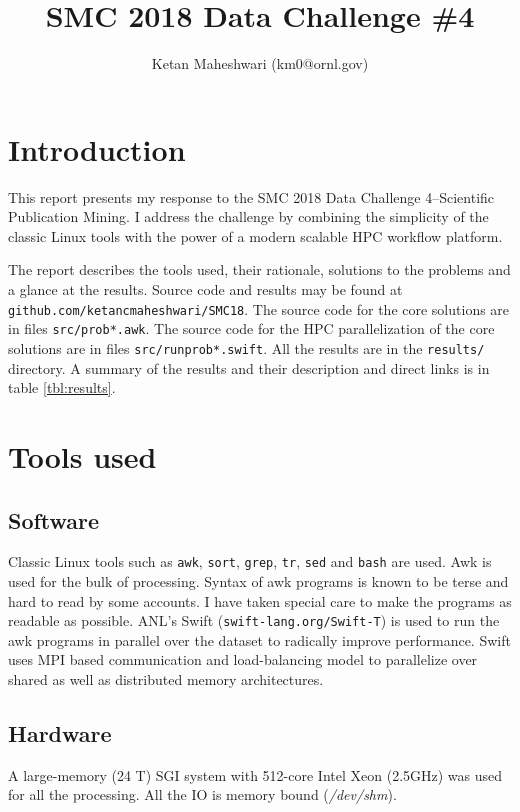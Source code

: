 \documentclass{article}
\title{SMC 2018 Data Challenge \#4}
\author{Ketan Maheshwari (km0@ornl.gov)}
\begin{document}
\maketitle
\section*{Introduction}

This report presents my response to the SMC 2018 Data Challenge 4--Scientific
Publication Mining. I address the challenge by combining the simplicity of the
classic Linux tools with the power of a modern scalable HPC workflow
platform.

The report describes the tools used, their rationale, solutions to the problems
and a glance at the results. Source code and results may be found at
\texttt{github.com/ketancmaheshwari/SMC18}. The source code for the core
solutions are in files \texttt{src/prob*.awk}. The source code for the HPC
parallelization of the core solutions are in files \texttt{src/runprob*.swift}.
All the results are in the \texttt{results/} directory. A summary of the
results and their description and direct links is in table \ref{tbl:results}.

\section*{Tools used}
\subsection*{Software}
Classic Linux tools such as \texttt{awk}, \texttt{sort}, \texttt{grep},
\texttt{tr}, \texttt{sed} and \texttt{bash} are used. Awk is used for the bulk
of processing.  Syntax of awk programs is known to be terse and hard to read by
some accounts. I have taken special care to make the programs as readable as
possible. ANL's Swift (\texttt{swift-lang.org/Swift-T}) is used to run the awk
programs in parallel over the dataset to radically improve performance.  Swift
uses MPI based communication and load-balancing model to parallelize over
shared as well as distributed memory architectures.

\subsection*{Hardware}
A large-memory (24 T) SGI system with 512-core Intel Xeon (2.5GHz) was used for
all the processing. All the IO is memory bound (\textit{/dev/shm}).
\end{document}
